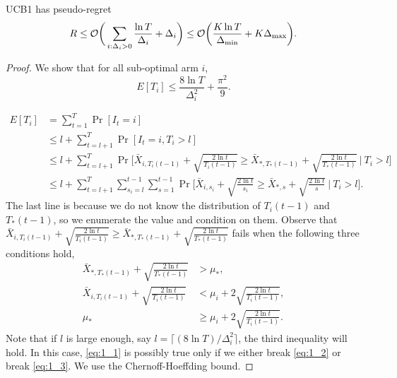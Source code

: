 \begin{thm}
    UCB1 has pseudo-regret
    \begin{equation}
        R \le \mathcal{O}\bigg(\sum_{i:\Delta_i>0} \frac{\ln T}{\Delta_i}+\Delta_i\bigg)
            \le \mathcal{O}\bigg(\frac{K\ln T}{\Delta_\text{min}}+K\Delta_\text{max}\bigg).
    \end{equation}
\end{thm}
\begin{proof}
    We show that for all sub-optimal arm $i$,
    \begin{equation}
        E[T_i] \le \frac{8\ln T}{\Delta_i^2} + \frac{\pi^2}{9}.
    \end{equation}

    \begin{align}
        E[T_i]
            &= \sum_{t=1}^T \Pr[I_t=i] \\
            &\le l + \sum_{t=l+1}^T \Pr[I_t=i, T_i>l] \\
            &\le l + \sum_{t=l+1}^T \Pr\Bigg[\bar X_{i,T_i(t-1)} +
                \sqrt{\frac{2\ln t}{T_i(t-1)}}\ge \bar X_{*,T_*(t-1)}+
                \sqrt{\frac{2\ln t}{T_{*}(t-1)}}~\Bigg|~T_i>l\Bigg] \\
            &\le l + \sum_{t=l+1}^T \sum_{s_i=l}^{t-1} \sum_{s=1}^{t-1}
                \Pr\Bigg[\bar X_{i,s_i} + \sqrt{\frac{2\ln t}{s_i}}\ge
                \bar X_{*,s}+\sqrt{\frac{2\ln t}{s}}~\Bigg|~T_i>l\Bigg]. \label{eq:1_1}
    \end{align}
    The last line is because
    we do not know the distribution of $T_i(t-1)$ and $T_*(t-1)$,
    so we enumerate the value and condition on them.
    Observe that $\bar X_{i,T_i(t-1)} + \sqrt{\frac{2\ln t}{T_i(t-1)}}\ge \bar X_{*,T_*(t-1)}+\sqrt{\frac{2\ln t}{T_{*}(t-1)}}$
    fails when the following three conditions hold,
    \begin{align}
        \bar X_{*,T_*(t-1)} + \sqrt{\frac{2\ln t}{T_{*}(t-1)}} &> \mu_*,  \\
        \bar X_{i,T_i(t-1)} + \sqrt{\frac{2\ln t}{T_{i}(t-1)}} &< \mu_i + 2\sqrt{\frac{2\ln t}{T_{i}(t-1)}}, \label{eq:1_2} \\
        \mu_* &\ge \mu_i + 2\sqrt{\frac{2\ln t}{T_{i}(t-1)}}. \label{eq:1_3}
    \end{align}
    Note that if $l$ is large enough,
    say $l=\lceil (8\ln T)/\Delta_i^2\rceil$,
    the third inequality will hold.
    In this case,
    \eqref{eq:1_1} is possibly true only if we either break \eqref{eq:1_2} or break \eqref{eq:1_3}.
    We use the Chernoff-Hoeffding bound.

\end{proof}
